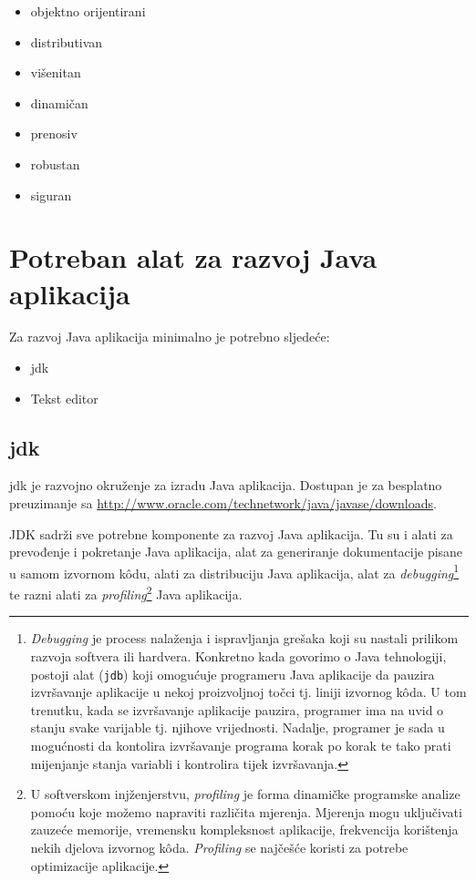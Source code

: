 \begin{itemize}
    \item objektno orijentirani
    \item distributivan
    \item višenitan
    \item dinamičan
    \item prenosiv
    \item robustan
    \item siguran
\end{itemize}

\section{Potreban alat za razvoj Java aplikacija}
Za razvoj Java aplikacija minimalno je potrebno sljedeće:

\begin{itemize}
    \item \gls{jdk}
    \item Tekst editor
\end{itemize}

\subsection{\acrshort{jdk}}
\gls{jdk} je razvojno okruženje za izradu Java aplikacija. Dostupan je za besplatno preuzimanje sa \url{http://www.oracle.com/technetwork/java/javase/downloads}.

\begin{infobox}
    JDK sadrži sve potrebne komponente za razvoj Java aplikacija. Tu su i alati za prevođenje i pokretanje Java aplikacija, alat za generiranje dokumentacije pisane u samom izvornom kôdu, alati za distribuciju Java aplikacija, alat za \emph{debugging}\footnote{\emph{Debugging} je process nalaženja i ispravljanja grešaka koji su nastali prilikom razvoja softvera ili hardvera. Konkretno kada govorimo o Java tehnologiji, postoji alat (\texttt{jdb}) koji omogućuje programeru Java aplikacije da pauzira izvršavanje aplikacije u nekoj proizvoljnoj točci tj. liniji izvornog kôda. U tom trenutku, kada se izvršavanje aplikacije pauzira, programer ima na uvid o stanju svake varijable tj. njihove vrijednosti. Nadalje, programer je sada u mogućnosti da kontolira izvršavanje programa korak po korak te tako prati mijenjanje stanja variabli i kontrolira tijek izvršavanja.} te razni alati za \emph{profiling}\footnote{U softverskom injženjerstvu, \emph{profiling} je forma dinamičke programske analize pomoću koje možemo napraviti različita mjerenja. Mjerenja mogu uključivati zauzeće memorije, vremensku kompleksnost aplikacije, frekvencija korištenja nekih djelova izvornog kôda. \emph{Profiling} se najčešće koristi za potrebe optimizacije aplikacije.} Java aplikacija.
\end{infobox}


